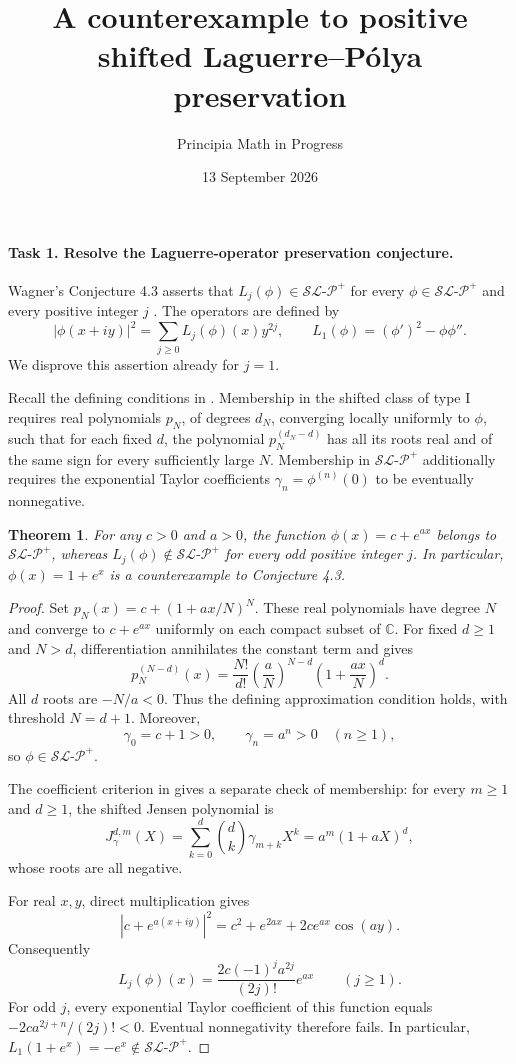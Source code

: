 \documentclass[10pt]{article}
\title{A counterexample to positive shifted Laguerre--P\'olya preservation}
\author{Principia Math in Progress}
\date{13 September 2026}
\newtheorem{theorem}{Theorem}
\newcommand{\SLP}{\mathcal{SL\text{-}P}^{+}}
\begin{document}
\maketitle

\paragraph{Task 1. Resolve the Laguerre-operator preservation conjecture.}
Wagner's Conjecture 4.3 asserts that \(L_j(\phi)\in\SLP\) for every
\(\phi\in\SLP\) and every positive integer \(j\) \cite{W}.
The operators are defined by
\[
 |\phi(x+iy)|^2=\sum_{j\ge0}L_j(\phi)(x)y^{2j},\qquad
 L_1(\phi)=(\phi')^2-\phi\phi''.
\]
We disprove this assertion already for \(j=1\).

Recall the defining conditions in \cite[p.~3]{W}. Membership in the
shifted class of type I requires real polynomials \(p_N\), of degrees
\(d_N\), converging locally uniformly to \(\phi\), such that for
each fixed \(d\), the polynomial \(p_N^{(d_N-d)}\) has all its roots
real and of the same sign for every sufficiently large \(N\).
Membership in \(\SLP\) additionally requires the exponential Taylor
coefficients \(\gamma_n=\phi^{(n)}(0)\) to be eventually nonnegative.

\begin{theorem}
For any \(c>0\) and \(a>0\), the function \(\phi(x)=c+e^{ax}\)
belongs to \(\SLP\), whereas \(L_j(\phi)\notin\SLP\) for every
odd positive integer \(j\). In particular, \(\phi(x)=1+e^x\)
is a counterexample to Conjecture 4.3.
\end{theorem}

\begin{proof}
Set \(p_N(x)=c+(1+ax/N)^N\). These real polynomials have degree
\(N\) and converge to \(c+e^{ax}\) uniformly on each compact subset
of \(\mathbb C\). For fixed \(d\ge1\) and \(N>d\), differentiation
annihilates the constant term and gives
\[
 p_N^{(N-d)}(x)=\frac{N!}{d!}\left(\frac aN\right)^{N-d}
                         \left(1+\frac{ax}{N}\right)^d.
 \tag{1}
\]
All \(d\) roots are \(-N/a<0\). Thus the defining approximation
condition holds, with threshold \(N=d+1\). Moreover,
\[
 \gamma_0=c+1>0,\qquad \gamma_n=a^n>0\quad(n\ge1),
\]
so \(\phi\in\SLP\).

The coefficient criterion in \cite[Theorem 1.1]{W} gives a separate
check of membership: for every \(m\ge1\) and \(d\ge1\), the shifted
Jensen polynomial is
\[
 J_\gamma^{d,m}(X)=\sum_{k=0}^d\binom dk\gamma_{m+k}X^k
                 =a^m(1+aX)^d,
 \tag{2}
\]
whose roots are all negative.

For real \(x,y\), direct multiplication gives
\[
 |c+e^{a(x+iy)}|^2=c^2+e^{2ax}+2ce^{ax}\cos(ay).
\]
Consequently
\[
 L_j(\phi)(x)=\frac{2c(-1)^j a^{2j}}{(2j)!}e^{ax}
                         \qquad(j\ge1).                 \tag{3}
\]
For odd \(j\), every exponential Taylor coefficient of this function
equals \(-2ca^{2j+n}/(2j)!<0\). Eventual nonnegativity therefore
fails. In particular, \(L_1(1+e^x)=-e^x\notin\SLP\).
\end{proof}
\end{document}
